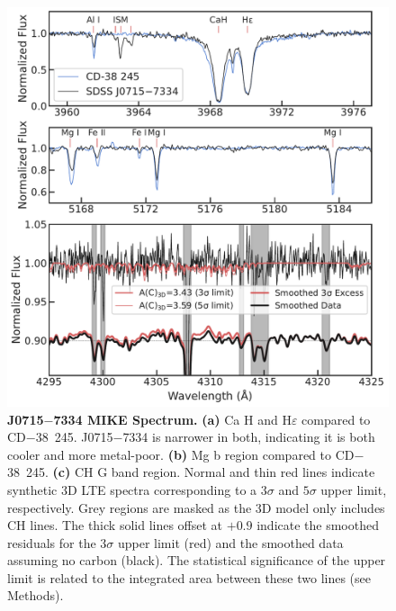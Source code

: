\documentclass{natureprintstyle}
\newcommand{\umpstar}{J0715$-$7334\xspace}
\newcommand{\cdstar}{CD$-$38~245\xspace}
\begin{document}

\begin{figure}[h!]
\centering
\includegraphics[width=\linewidth]{nature_spectrumfig1.pdf}
\vspace{-4mm}
\caption{\textbf{\umpstar MIKE Spectrum.}
\textbf{(a)} Ca H and H$\varepsilon$ compared to {\cdstar}\cite{Roederer2014}. \umpstar is narrower in both, indicating it is both cooler and more metal-poor.
\textbf{(b)} Mg b region compared to \cdstar.
\textbf{(c)} CH G band region. Normal and thin red lines indicate synthetic 3D LTE spectra corresponding to a $3\sigma$ and $5\sigma$ upper limit, respectively. Grey regions are masked as the 3D model only includes CH lines. The thick solid lines offset at $+0.9$ indicate the smoothed residuals for the $3\sigma$ upper limit (red) and the smoothed data assuming no carbon (black). The statistical significance of the upper limit is related to the integrated area between these two lines (see Methods).
\label{fig:spectrum}
}
\vspace{-6mm}
\end{figure}
\end{document}
